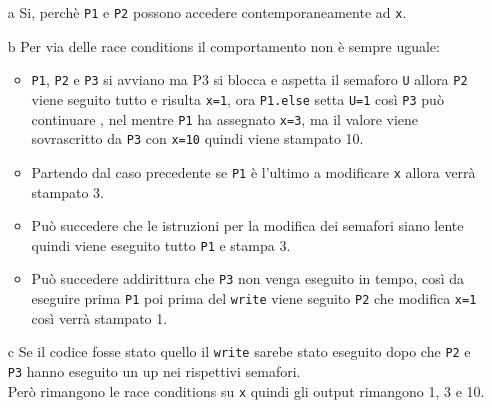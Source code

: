 \documentclass{article}
\begin{document}
    \begin{itemize}
        \item[a] Si, perchè \verb+P1+ e \verb+P2+ possono accedere contemporaneamente ad \verb+x+.
        \item[b] Per via delle race conditions il comportamento non è sempre uguale:
            \begin{itemize}
                \item \verb+P1+, \verb+P2+ e \verb+P3+ si avviano ma P3 si blocca e aspetta il semaforo \verb+U+ allora \verb+P2+ viene seguito tutto e risulta \verb+x=1+, ora \verb+P1.else+ setta \verb+U=1+ così \verb+P3+ può continuare , nel mentre \verb+P1+ ha assegnato \verb+x=3+, ma il valore viene sovrascritto da \verb+P3+ con \verb+x=10+ quindi viene stampato 10.
                \item Partendo dal caso precedente se \verb+P1+ è l'ultimo a modificare \verb+x+ allora verrà stampato 3.
                \item Può succedere che le istruzioni per la modifica dei semafori siano lente quindi viene  eseguito tutto \verb+P1+ e stampa 3.
                \item Può succedere addirittura che \verb+P3+ non venga eseguito in tempo, così da eseguire prima \verb+P1+ poi prima del \verb+write+ viene seguito \verb+P2+ che modifica \verb+x=1+ così verrà stampato 1.
            \end{itemize}
        \item[c] Se il codice fosse stato quello il \verb+write+ sarebe stato eseguito dopo che \verb+P2+ e \verb+P3+ hanno eseguito un up nei rispettivi semafori.\\
        Però rimangono le race conditions su \verb+x+ quindi gli output rimangono 1, 3 e 10.
    \end{itemize}
\end{document}
